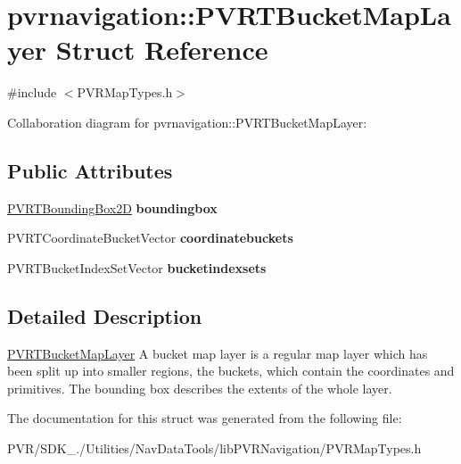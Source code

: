 \hypertarget{structpvrnavigation_1_1_p_v_r_t_bucket_map_layer}{\section{pvrnavigation\+:\+:P\+V\+R\+T\+Bucket\+Map\+Layer Struct Reference}
\label{structpvrnavigation_1_1_p_v_r_t_bucket_map_layer}
}


{\ttfamily \#include $<$P\+V\+R\+Map\+Types.\+h$>$}



Collaboration diagram for pvrnavigation\+:\+:P\+V\+R\+T\+Bucket\+Map\+Layer\+:
\subsection*{Public Attributes}
\begin{DoxyCompactItemize}
\item 
\hypertarget{structpvrnavigation_1_1_p_v_r_t_bucket_map_layer_ae954ad95f087b182984a6972f3a47222}{\hyperlink{structpvrnavigation_1_1_p_v_r_t_bounding_box2_d}{P\+V\+R\+T\+Bounding\+Box2\+D} {\bfseries boundingbox}}\label{structpvrnavigation_1_1_p_v_r_t_bucket_map_layer_ae954ad95f087b182984a6972f3a47222}

\item 
\hypertarget{structpvrnavigation_1_1_p_v_r_t_bucket_map_layer_abeae1a7d41858e253ccef61120286dd3}{P\+V\+R\+T\+Coordinate\+Bucket\+Vector {\bfseries coordinatebuckets}}\label{structpvrnavigation_1_1_p_v_r_t_bucket_map_layer_abeae1a7d41858e253ccef61120286dd3}

\item 
\hypertarget{structpvrnavigation_1_1_p_v_r_t_bucket_map_layer_a02547e7427e3c4a5864ce1669e786d19}{P\+V\+R\+T\+Bucket\+Index\+Set\+Vector {\bfseries bucketindexsets}}\label{structpvrnavigation_1_1_p_v_r_t_bucket_map_layer_a02547e7427e3c4a5864ce1669e786d19}

\end{DoxyCompactItemize}


\subsection{Detailed Description}


  \hyperlink{structpvrnavigation_1_1_p_v_r_t_bucket_map_layer}{P\+V\+R\+T\+Bucket\+Map\+Layer}  A bucket map layer is a regular map layer which has been split up into smaller regions, the buckets, which contain the coordinates and primitives. The bounding box describes the extents of the whole layer. 

The documentation for this struct was generated from the following file\+:\begin{DoxyCompactItemize}
\item 
P\+V\+R/\+S\+D\+K\+\_./\+Utilities/\+Nav\+Data\+Tools/lib\+P\+V\+R\+Navigation/P\+V\+R\+Map\+Types.\+h\end{DoxyCompactItemize}

